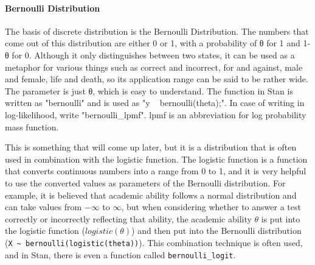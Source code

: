 \documentclass{ltjsbook}
\begin{document}
\paragraph{Bernoulli Distribution}
The basis of discrete distribution is the Bernoulli Distribution. The numbers that come out of this distribution are either 0 or 1, with a probability of θ for 1 and 1-θ for 0. Although it only distinguishes between two states, it can be used as a metaphor for various things such as correct and incorrect, for and against, male and female, life and death, so its application range can be said to be rather wide. The parameter is just θ, which is easy to understand. The function in Stan is written as "bernoulli" and is used as "y ~ bernoulli(theta);". In case of writing in log-likelihood, write "bernoulli_lpmf". lpmf is an abbreviation for log probability mass function.

This is something that will come up later, but it is a distribution that is often used in combination with the logistic function. The logistic function is a function that converts continuous numbers into a range from 0 to 1, and it is very helpful to use the converted values as parameters of the Bernoulli distribution. For example, it is believed that academic ability follows a normal distribution and can take values from $-\infty$ to $\infty$, but when considering whether to answer a test correctly or incorrectly reflecting that ability, the academic ability $\theta$ is put into the logistic function ($logistic(\theta)$) and then put into the Bernoulli distribution (\verb|X ~ bernoulli(logistic(theta))|). This combination technique is often used, and in Stan, there is even a function called \verb|bernoulli_logit|.
\end{document}
